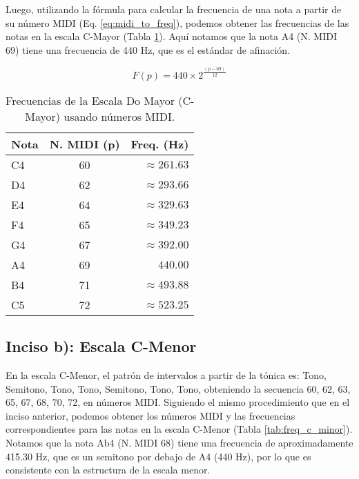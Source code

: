 \documentclass[paper=letter, fontsize=11pt, draft=false]{scrartcl}
\numberwithin{equation}{problemcounter} %
\numberwithin{figure}{problemcounter} %
\numberwithin{table}{problemcounter} %
\numberwithin{subsection}{problemcounter}
\begin{document}
Luego, utilizando la fórmula para calcular la frecuencia de una nota a partir de su número MIDI (Eq. \ref{eq:midi_to_freq}), podemos obtener las frecuencias de las notas en la escala C-Mayor (Tabla \ref{tab:freq_c_major}). Aquí notamos que la nota A4 (N. MIDI 69) tiene una frecuencia de 440 Hz, que es el estándar de afinación.

\begin{equation}
    F(p) = 440 \times 2^{\frac{(p - 69)}{12}}
    \label{eq:midi_to_freq}
\end{equation}

\begin{table}[h]
\centering
\begin{tabular}{|l|c|r|}
\hline
\textbf{Nota} & \textbf{N. MIDI (p)} & \textbf{Freq. (Hz)} \\ \hline
C4            & 60                   & $\approx 261.63$         \\
D4            & 62                   & $\approx 293.66$         \\
E4            & 64                   & $\approx 329.63$         \\
F4            & 65                   & $\approx 349.23$         \\
G4            & 67                   & $\approx 392.00$         \\
A4            & 69                   & $440.00$                 \\
B4            & 71                   & $\approx 493.88$         \\
C5            & 72                   & $\approx 523.25$         \\ \hline
\end{tabular}
\caption{Frecuencias de la Escala Do Mayor (C-Mayor) usando números MIDI.}
\label{tab:freq_c_major}
\end{table}

\newpage
\subsection{Inciso b): Escala C-Menor}

En la escala C-Menor, el patrón de intervalos a partir de la tónica es: Tono, Semitono, Tono, Tono, Semitono, Tono, Tono, obteniendo la secuencia 60, 62, 63, 65, 67, 68, 70, 72, en números MIDI. Siguiendo el mismo procedimiento que en el inciso anterior, podemos obtener los números MIDI y las frecuencias correspondientes para las notas en la escala C-Menor (Tabla \ref{tab:freq_c_minor}). Notamos que la nota Ab4 (N. MIDI 68) tiene una frecuencia de aproximadamente 415.30 Hz, que es un semitono por debajo de A4 (440 Hz), por lo que es consistente con la estructura de la escala menor.
\end{document}
